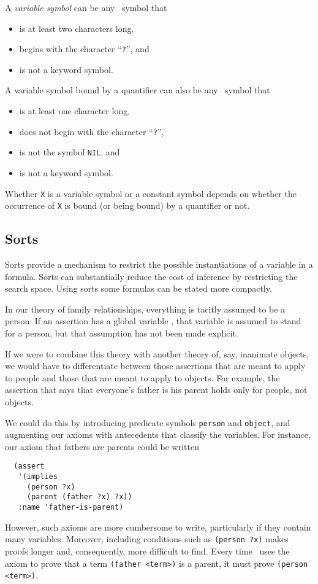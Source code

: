 A {\em variable symbol}
can be any \lisp\   symbol that
\begin{itemize}
\item is at least two characters long,
\item begins with the character ``{\tt ?}'', and
\item is not a keyword symbol.
\end{itemize}
A variable symbol bound by a quantifier
can also be any \lisp\   symbol that
\begin{itemize}
\item is at least one character long,
\item does not begin with the character ``{\tt ?}'',
\item is not the symbol {\tt NIL}, and
\item is not a keyword symbol.
\end{itemize}
Whether {\tt X} is a variable symbol or a constant symbol
depends on whether the occurrence of {\tt X} is bound (or being bound) by
a quantifier or not.


\subsection{Sorts}
\label{subsec-sorts}

Sorts provide a mechanism to restrict the possible instantiations of a
variable in a formula.  Sorts can substantially reduce the cost of
inference by restricting the search space.  Using sorts some formulas
can be stated more compactly.

In our theory of family relationships, everything is tacitly assumed
to be a person.  If an assertion has a global variable \varx\/, that
variable is assumed to stand for a person, but that assumption has not
been made explicit.

If we were to combine this theory with another theory of, say,
inanimate objects, we would have to differentiate between those assertions
that are meant to apply to people and those that are meant to apply
to objects.  For example, the assertion that says that everyone's father
is his parent holds only for people, not objects.

We could do this by introducing predicate symbols \verb'person' and
\verb'object', and augmenting our axioms with antecedents that classify the
variables.  For instance, our axiom that fathers are parents could be written
\begin{verbatim}
  (assert
   '(implies
     (person ?x)
     (parent (father ?x) ?x))
   :name 'father-is-parent)
\end{verbatim}
However, such axioms are more cumbersome to write, particularly if they
 contain many variables.  Moreover, including conditions such as
 \verb'(person ?x)' makes proofs longer and, consequently, more difficult to
 find.  Every time \snark\   uses the axiom to prove that a term
\verb'(father <term>)' is a parent, it must prove \verb'(person <term>)'.

